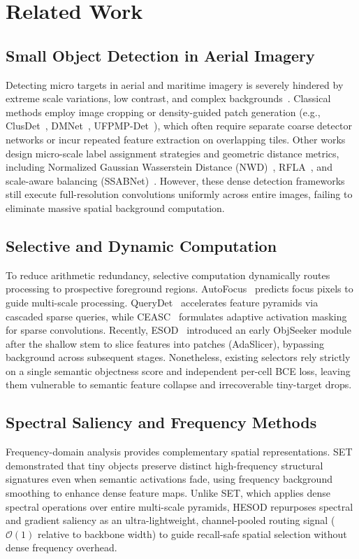 \section{Related Work}
\label{sec:related}

\subsection{Small Object Detection in Aerial Imagery}
\label{ssec:related_sod}

Detecting micro targets in aerial and maritime imagery is severely hindered by extreme scale variations, low contrast, and complex backgrounds~\cite{VisDrone,UAVDT,TinyPerson,SeaDronesSee}. Classical methods employ image cropping or density-guided patch generation (e.g., ClusDet~\cite{ClusDet}, DMNet~\cite{DMNet}, UFPMP-Det~\cite{UFPMP}), which often require separate coarse detector networks or incur repeated feature extraction on overlapping tiles. Other works design micro-scale label assignment strategies and geometric distance metrics, including Normalized Gaussian Wasserstein Distance (NWD)~\cite{NWD}, RFLA~\cite{RFLA}, and scale-aware balancing (SSABNet)~\cite{SSABNet}. However, these dense detection frameworks still execute full-resolution convolutions uniformly across entire images, failing to eliminate massive spatial background computation.

\subsection{Selective and Dynamic Computation}
\label{ssec:related_selective}

To reduce arithmetic redundancy, selective computation dynamically routes processing to prospective foreground regions. AutoFocus~\cite{AutoFocus} predicts focus pixels to guide multi-scale processing. QueryDet~\cite{QueryDet} accelerates feature pyramids via cascaded sparse queries, while CEASC~\cite{CEASC} formulates adaptive activation masking for sparse convolutions. Recently, ESOD~\cite{ESOD} introduced an early ObjSeeker module after the shallow stem to slice features into patches (AdaSlicer), bypassing background across subsequent stages. Nonetheless, existing selectors rely strictly on a single semantic objectness score and independent per-cell BCE loss, leaving them vulnerable to semantic feature collapse and irrecoverable tiny-target drops.

\subsection{Spectral Saliency and Frequency Methods}
\label{ssec:related_spectral}

Frequency-domain analysis provides complementary spatial representations. SET~\cite{SET} demonstrated that tiny objects preserve distinct high-frequency structural signatures even when semantic activations fade, using frequency background smoothing to enhance dense feature maps. Unlike SET, which applies dense spectral operations over entire multi-scale pyramids, HESOD repurposes spectral and gradient saliency as an ultra-lightweight, channel-pooled routing signal ($\mathcal{O}(1)$ relative to backbone width) to guide recall-safe spatial selection without dense frequency overhead.

